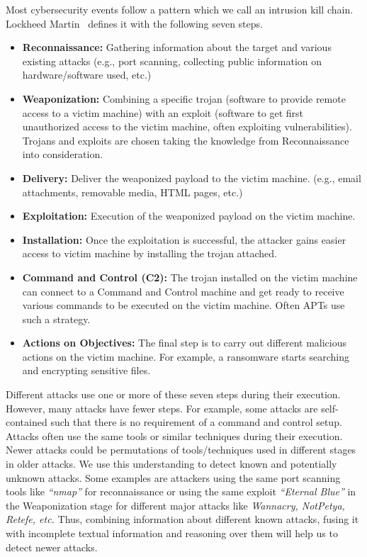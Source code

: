 Most cybersecurity events follow a pattern which we call an intrusion kill chain. Lockheed Martin~\cite{hutchins2011intelligence} defines it with the following seven steps.
\begin{itemize}
	\item {\bf Reconnaissance:} Gathering information about the target and various existing attacks (e.g., port scanning, collecting public information on hardware/software used, etc.)
	\item {\bf Weaponization:} Combining a specific trojan (software to provide remote access to a victim machine) with an exploit (software to get first unauthorized access to the victim machine, often exploiting vulnerabilities). Trojans and exploits are chosen taking the knowledge from Reconnaissance into consideration.
	\item {\bf Delivery:} Deliver the weaponized payload to the victim machine. (e.g., email attachments, removable media, HTML pages, etc.)
	\item {\bf Exploitation:} Execution of the weaponized payload on the victim machine.
	\item {\bf Installation:} Once the exploitation is successful, the attacker gains easier access to victim machine by installing the trojan attached. 
	\item {\bf Command and Control (C2):} The trojan installed on the victim machine can connect to a Command and Control machine and get ready to receive various commands to be executed on the victim machine. Often APTs use such a strategy. 
	\item {\bf Actions on Objectives:} The final step is to carry out different malicious actions on the victim machine. For example, a ransomware starts searching and encrypting sensitive files. 
\end{itemize} 

Different attacks use one or more of these seven steps during their execution. However, many attacks have fewer steps. For example, some attacks are self-contained such that there is no requirement of a command and control setup. Attacks often use the same tools or similar techniques during their execution. Newer attacks could be permutations of tools/techniques used in different stages in older attacks. We use this understanding to detect known and potentially unknown attacks. Some examples are attackers using the same port scanning tools like \textit{``nmap''} for reconnaissance or  using the same exploit \textit{``Eternal Blue''} in the Weaponization stage for different major attacks like \textit{Wannacry, NotPetya, Retefe, etc.}
Thus, combining information about different known attacks, fusing it with incomplete textual information and reasoning over them will help us to detect newer attacks. 

